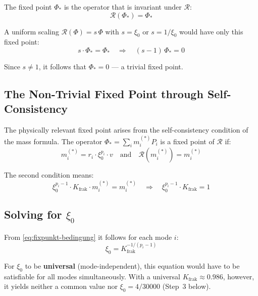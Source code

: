 The fixed point $\Phi_*$ is the operator that is invariant
under $\mathcal{R}$:
\begin{equation}
  \mathcal{R}(\Phi_*) = \Phi_*
  \label{eq:fixpunkt}
\end{equation}

A uniform scaling $\mathcal{R}(\Phi) = s\,\Phi$ with
$s = \xi_0$ or $s = 1/\xi_0$ would have only this fixed point:
\begin{equation}
  s \cdot \Phi_* = \Phi_*
  \quad \Rightarrow \quad
  (s - 1)\,\Phi_* = 0
\end{equation}

Since $s \neq 1$, it follows that $\Phi_* = 0$ --- a trivial fixed point.

\subsection{The Non-Trivial Fixed Point through Self-Consistency}

The physically relevant fixed point arises from the
self-consistency condition of the mass formula. The operator
$\Phi_* = \sum_i m_i^{(*)} P_i$ is a fixed point of $\mathcal{R}$
if:
\begin{equation}
  m_i^{(*)} = r_i \cdot \xi_0^{p_i} \cdot v
  \quad \text{and} \quad
  \mathcal{R}(m_i^{(*)}) = m_i^{(*)}
  \label{eq:selbstkonsistenz}
\end{equation}

The second condition means:
\begin{equation}
  \xi_0^{p_i - 1} \cdot K_{\text{frak}} \cdot m_i^{(*)}
  = m_i^{(*)}
  \quad \Rightarrow \quad
  \xi_0^{p_i - 1} \cdot K_{\text{frak}} = 1
  \label{eq:fixpunkt-bedingung}
\end{equation}

\subsection{Solving for \texorpdfstring{$\xi_0$}{xi0}}

From \eqref{eq:fixpunkt-bedingung} it follows for each mode $i$:
\begin{equation}
  \xi_0 = K_{\text{frak}}^{-1/(p_i-1)}
  \label{eq:xi0-aus-fixpunkt}
\end{equation}

For $\xi_0$ to be \textbf{universal} (mode-independent), this
equation would have to be satisfiable for all modes simultaneously.
With a universal $K_{\text{frak}} \approx 0.986$, however, it yields
neither a common value nor $\xi_0 = 4/30000$ (Step~3 below).

